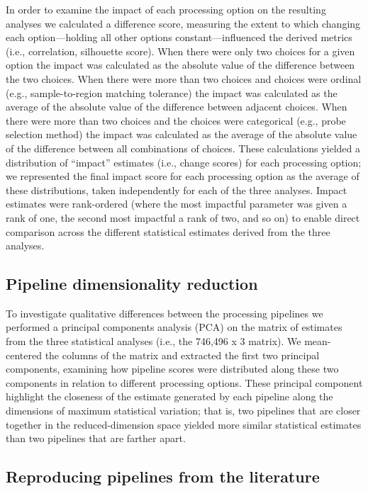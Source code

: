 \documentclass[12pt,aps,pra,reprint,showkeys]{revtex4-1}
\begin{document}
In order to examine the impact of each processing option on the resulting analyses we calculated a difference score, measuring the extent to which changing each option---holding all other options constant---influenced the derived metrics (i.e., correlation, silhouette score).
When there were only two choices for a given option the impact was calculated as the absolute value of the difference between the two choices.
When there were more than two choices and choices were ordinal (e.g., sample-to-region matching tolerance) the impact was calculated as the average of the absolute value of the difference between adjacent choices.
When there were more than two choices and the choices were categorical (e.g., probe selection method) the impact was calculated as the average of the absolute value of the difference between all combinations of choices.
These calculations yielded a distribution of ``impact'' estimates (i.e., change scores) for each processing option; we represented the final impact score for each processing option as the average of these distributions, taken independently for each of the three analyses.
Impact estimates were rank-ordered (where the most impactful parameter was given a rank of one, the second most impactful a rank of two, and so on) to enable direct comparison across the different statistical estimates derived from the three analyses.

\subsection*{Pipeline dimensionality reduction}

To investigate qualitative differences between the processing pipelines we performed a principal components analysis (PCA) on the matrix of estimates from the three statistical analyses (i.e., the 746,496 x 3 matrix).
We mean-centered the columns of the matrix and extracted the first two principal components, examining how pipeline scores were distributed along these two components in relation to different processing options.
These principal component highlight the closeness of the estimate generated by each pipeline along the dimensions of maximum statistical variation; that is, two pipelines that are closer together in the reduced-dimension space yielded more similar statistical estimates than two pipelines that are farther apart.

\subsection*{Reproducing pipelines from the literature}
\end{document}
